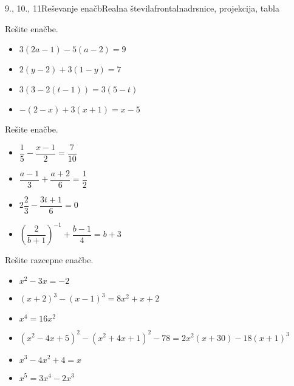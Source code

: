 \begin{priprava}{9., 10., 11}{}{Reševanje enačb}{Realna števila}{frontalna}{drsnice, projekcija, tabla}
        ~~~\\




        
            \begin{naloga}
                Rešite enačbe.
                \begin{itemize}
                        \item $3(2a-1)-5(a-2)=9$ 
                        \item $2(y-2)+3(1-y)=7$ 
                        \item $3(3-2(t-1))=3(5-t)$ 
                        \item $-(2-x)+3(x+1)=x-5$ 
                \end{itemize}
            \end{naloga}
        


        
            \begin{naloga}
                Rešite enačbe.
                \begin{itemize}
                        \item $\dfrac{1}{5}-\dfrac{x-1}{2}=\dfrac{7}{10}$ 
                        \item $\dfrac{a-1}{3}+\dfrac{a+2}{6}=\dfrac{1}{2}$ 
                        \item $2\dfrac{2}{3}-\dfrac{3t+1}{6}=0$ 
                        \item $\left(\dfrac{2}{b+1}\right)^{-1}+\dfrac{b-1}{4}=b+3$ 
                \end{itemize}
            \end{naloga}
        



        
            \begin{naloga}
                Rešite razcepne enačbe.
                \begin{itemize}
                        \item $x^2-3x=-2$ 
                        \item $(x+2)^3-(x-1)^3=8x^2+x+2$ 
                        \item $x^4=16x^2$ 
                        \item $(x^2-4x+5)^2-(x^2+4x+1)^2-78=2x^2(x+30)-18(x+1)^3$ 
                        \item $x^3-4x^2+4=x$ 
                        \item $x^5=3x^4-2x^3$ 
                \end{itemize}
            \end{naloga}
        



\end{priprava}
